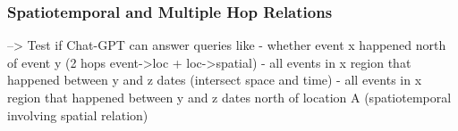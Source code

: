 \subsubsection{Spatiotemporal and Multiple Hop Relations}
--> Test if Chat-GPT can answer queries like
- whether event x happened north of event y (2 hops event->loc + loc->spatial)
- all events in x region that happened between y and z dates (intersect space and time)
- all events in x region that happened between y and z dates north of location A (spatiotemporal involving spatial relation)








        





